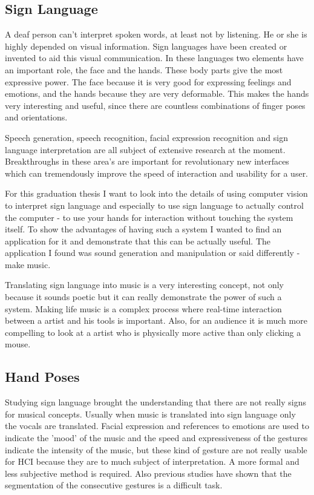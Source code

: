 \subsection*{Sign Language}

A deaf person can't interpret spoken words, at least not by listening. He or she is highly depended on visual information. Sign languages have been created or invented to aid this visual communication. In these languages two elements have an important role, the face and the hands. These body parts give the most expressive power. The face because it is very good for expressing feelings and emotions, and the hands because they are very deformable. This makes the hands very interesting and useful, since there are countless combinations of finger poses and orientations. 

Speech generation, speech recognition, facial expression recognition and sign language interpretation are all subject of extensive research at the moment. Breakthroughs in these area's are important for revolutionary new interfaces which can tremendously improve the speed of interaction and usability for a user. 

For this graduation thesis I want to look into the details of using computer vision to interpret sign language and especially to use sign language to actually control the computer - to use your hands for interaction without touching the system itself. To show the advantages of having such a system I wanted to find an application for it and demonstrate that this can be actually useful. The application I found was sound generation and manipulation or said differently - make music. 

Translating sign language into music is a very interesting concept, not only because it sounds poetic but it can really demonstrate the power of such a system. Making life music is a complex process where real-time interaction between a artist and his tools is important. Also, for an audience it is much more compelling to look at a artist who is physically more active than only clicking a mouse.

\subsection*{Hand Poses}
Studying sign language brought the understanding that there are not really signs for musical concepts. Usually when music is translated into sign language only the vocals are translated. Facial expression and references to emotions are used to indicate the 'mood' of the music and the speed and expressiveness of the gestures indicate the intensity of the music, but these kind of gesture are not really usable for HCI because they are to much subject of interpretation. A more formal and less subjective method is required. Also previous studies have shown that the segmentation of the consecutive gestures is a difficult task\cite{Buehler2009}.

